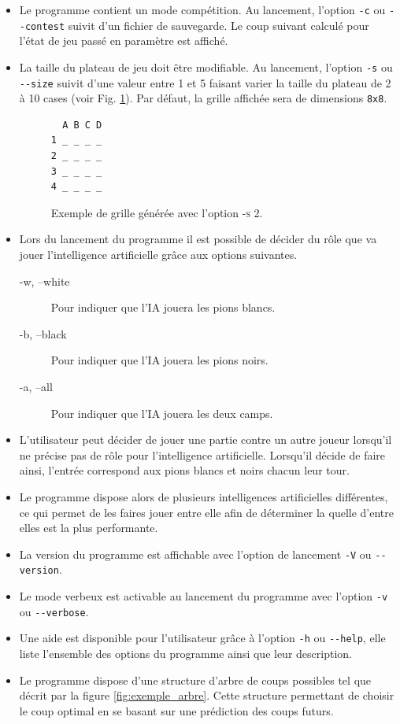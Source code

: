 \documentclass[10pt,a4paper]{article}
\begin{document}
\begin{itemize}
\item Le programme contient un mode compétition. Au lancement, l'option \verb!-c! ou \verb!--contest! suivit d'un fichier de sauvegarde. Le coup suivant calculé pour l'état de jeu passé en paramètre est affiché.
\item La taille du plateau de jeu doit être modifiable. Au lancement, l'option \verb!-s! ou \verb!--size! suivit d'une valeur entre 1 et 5 faisant varier la taille du plateau de 2 à 10 cases (voir Fig. \ref{fig:exemple_taille}). Par défaut, la grille affichée sera de dimensions
\verb!8x8!.

\begin{figure}[H]    
\centering
\begin{BVerbatim}
  A B C D
1 _ _ _ _
2 _ _ _ _
3 _ _ _ _
4 _ _ _ _    
\end{BVerbatim}
\caption {Exemple de grille générée avec l'option \textsc{-s 2}.\label{fig:exemple_taille}}
\end{figure}

\item Lors du lancement du programme il est possible de décider du rôle que va jouer l'intelligence artificielle grâce aux options suivantes.
\begin{description}
\item [-w, --white] Pour indiquer que l'IA jouera les pions blancs.
\item [-b, --black] Pour indiquer que l'IA jouera les pions noirs.
\item [-a, --all] Pour indiquer que l'IA jouera les deux camps.
\end{description}
\item L'utilisateur peut décider de jouer une partie contre un autre joueur lorsqu'il ne précise pas de rôle pour l'intelligence artificielle. Lorsqu'il décide de faire ainsi, l'entrée correspond aux pions blancs et noirs chacun leur tour.
\item Le programme dispose alors de plusieurs intelligences artificielles différentes, ce qui permet de les faires jouer entre elle afin de déterminer la quelle d'entre elles est la plus performante. 
\item La version du programme est affichable avec l'option de lancement \verb!-V! ou \verb!--version!. 
\item Le mode verbeux est activable au lancement du programme avec l'option \verb!-v! ou \verb!--verbose!.
\item Une aide est disponible pour l'utilisateur grâce à l'option \verb!-h! ou \verb!--help!, elle liste l'ensemble des options du programme ainsi que leur description.
\item Le programme dispose d'une structure d'arbre de coups possibles tel que décrit par la figure \ref{fig:exemple_arbre}. Cette structure permettant de choisir le coup optimal en se basant sur une prédiction des coups futurs.
\end{itemize}
\end{document}
